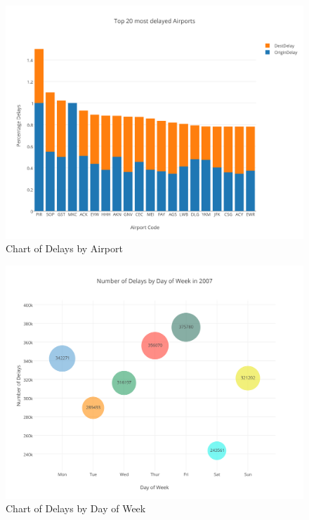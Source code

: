 \documentclass[letterpaper,11pt]{article}
\begin{document}
\begin{figure}[htb]
\centering
\includegraphics[width=1.1\linewidth]{delayedairports.png}
\caption{Chart of Delays by Airport}
\label{fig:airportdelays}
\end{figure}

\begin{figure}[htb]
\centering
\includegraphics[width=1.1\linewidth]{delayedbyweek.png}
\caption{Chart of Delays by Day of Week}
\label{fig:weekdelays}
\end{figure}
\end{document}
